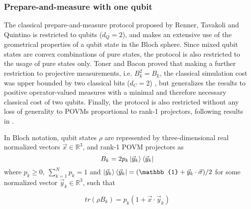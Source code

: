 \subsubsection{Prepare-and-measure with one qubit}\label{section:protocol_pm}
The classical prepare-and-measure protocol proposed by Renner, Tavakoli and Quintino \cite{renner2022} is restricted to qubits ($d_Q=2$), and makes an extensive use of the geometrical properties of a qubit state in the Bloch sphere. Since mixed qubit states are convex combinations of pure states, the protocol is also restricted to the usage of pure states only. Toner and Bacon proved that making a further restriction to projective measurements, i.e. $B_{k}^{2} = B_{k}$, the classical simulation cost was upper bounded by two classical bits ($d_C=2$) \cite{toner2003}, but \cite{renner2022} generalizes the results to positive operator-valued measures with a minimal and therefore necessary classical cost of two qubits. Finally, the protocol is also restricted without any loss of generality to POVMs proportional to rank-1 projectors, following results in \cite{barrett2002}.

In Bloch notation, qubit states $\rho$ are represented by three-dimensional real normalized vectors $\vec{x} \in \mathbb{R}^{3}$, and rank-1 POVM projectors as 
\begin{equation}\label{eq:rank1_povm}
B_{k} = 2p_{k}\ket{\vec{y}_{k}}\bra{\vec{y}_{k}}
\end{equation}
where $p_{k}\ge0,\ \sum_{k=1}^{N}p_{k}=1$ and $\ket{\vec{y}_{k}}\bra{\vec{y}_{k}} = (\mathbb{1} + \vec{y}_{k} \cdot \vec{\sigma})/2$ for some normalized vector $\vec{y}_{k} \in \mathbb{R}^{3}$, such that

\begin{equation}
tr(\rho B_{k}) = p_{k}(1 + \vec{x} \cdot \vec{y}_{k}) 
\end{equation}

